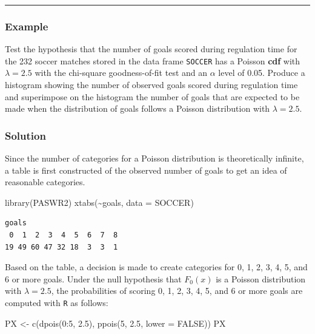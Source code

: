 \documentclass[
]{article}
\newenvironment{Shaded}{\begin{snugshade}}{\end{snugshade}}
\newcommand{\AttributeTok}[1]{\textcolor[rgb]{0.77,0.63,0.00}{#1}}
\newcommand{\ConstantTok}[1]{\textcolor[rgb]{0.00,0.00,0.00}{#1}}
\newcommand{\DecValTok}[1]{\textcolor[rgb]{0.00,0.00,0.81}{#1}}
\newcommand{\FloatTok}[1]{\textcolor[rgb]{0.00,0.00,0.81}{#1}}
\newcommand{\FunctionTok}[1]{\textcolor[rgb]{0.00,0.00,0.00}{#1}}
\newcommand{\NormalTok}[1]{#1}
\newcommand{\OtherTok}[1]{\textcolor[rgb]{0.56,0.35,0.01}{#1}}
\newcommand{\SpecialCharTok}[1]{\textcolor[rgb]{0.00,0.00,0.00}{#1}}
\begin{document}
\begin{center}\rule{0.5\linewidth}{0.5pt}\end{center}

\hypertarget{example}{%
\subsubsection*{Example}\label{example}}

Test the hypothesis that the number of goals scored during regulation time for the 232 soccer matches stored in the data frame \texttt{SOCCER} has a Poisson \textbf{cdf} with \(\lambda=2.5\) with the chi-square goodness-of-fit test and an \(\alpha\) level of 0.05. Produce a histogram showing the number of observed goals scored during regulation time and superimpose on the histogram the number of goals that are expected to be made when the distribution of goals follows a Poisson distribution with \(\lambda=2.5\).

\hypertarget{solution}{%
\subsubsection*{Solution}\label{solution}}

Since the number of categories for a Poisson distribution is
theoretically infinite, a table is first constructed of the observed
number of goals to get an idea of reasonable categories.

\begin{Shaded}
\begin{Highlighting}[]
\FunctionTok{library}\NormalTok{(PASWR2)}
\FunctionTok{xtabs}\NormalTok{(}\SpecialCharTok{\textasciitilde{}}\NormalTok{goals, }\AttributeTok{data =}\NormalTok{ SOCCER)}
\end{Highlighting}
\end{Shaded}

\begin{verbatim}
goals
 0  1  2  3  4  5  6  7  8 
19 49 60 47 32 18  3  3  1 
\end{verbatim}

Based on the table, a decision is made to create categories for 0, 1, 2, 3, 4, 5, and 6 or more goals. Under the null hypothesis that \(F_0(x)\) is a Poisson distribution with \(\lambda=2.5\), the probabilities of scoring 0, 1, 2, 3, 4, 5, and 6 or more goals are computed with \texttt{R} as follows:

\begin{Shaded}
\begin{Highlighting}[]
\NormalTok{PX }\OtherTok{\textless{}{-}} \FunctionTok{c}\NormalTok{(}\FunctionTok{dpois}\NormalTok{(}\DecValTok{0}\SpecialCharTok{:}\DecValTok{5}\NormalTok{, }\FloatTok{2.5}\NormalTok{), }\FunctionTok{ppois}\NormalTok{(}\DecValTok{5}\NormalTok{, }\FloatTok{2.5}\NormalTok{, }\AttributeTok{lower =} \ConstantTok{FALSE}\NormalTok{))}
\NormalTok{PX}
\end{Highlighting}
\end{Shaded}
\end{document}
